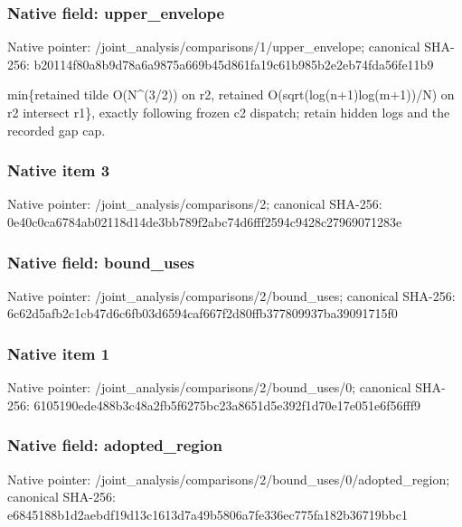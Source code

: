 \documentclass[10pt,a4paper]{article}
\begin{document}
\subsubsection{Native field: upper\_envelope}


Native pointer: /joint\_analysis/comparis\allowbreak{}ons/1/upper\_envelope; canonical SHA-256: b20114f80a8b9d78a6a9875a\allowbreak{}669b45d861fa19c61b985b2e\allowbreak{}2eb74fda56fe11b9


min\{retained tilde O(N\textasciicircum{}(3/2)) on r2, retained O(sqrt(log(n+1)log(m+1))/N) on r2 intersect r1\}, exactly following frozen c2 dispatch; retain hidden logs and the recorded gap cap.


\subsubsection{Native item 3}


Native pointer: /joint\_analysis/comparisons/2; canonical SHA-256: 0e40c0ca6784ab02118d14de\allowbreak{}3bb789f2abc74d6fff2594c9\allowbreak{}428c27969071283e



\subsubsection{Native field: bound\_uses}


Native pointer: /joint\_analysis/comparis\allowbreak{}ons/2/bound\_uses; canonical SHA-256: 6c62d5afb2c1cb47d6c6fb03\allowbreak{}d6594caf667f2d80ffb37780\allowbreak{}9937ba39091715f0



\subsubsection{Native item 1}


Native pointer: /joint\_analysis/comparis\allowbreak{}ons/2/bound\_uses/0; canonical SHA-256: 6105190ede488b3c48a2fb5f\allowbreak{}6275bc23a8651d5e392f1d70\allowbreak{}e17e051e6f56fff9



\subsubsection{Native field: adopted\_region}


Native pointer: /joint\_analysis/comparis\allowbreak{}ons/2/bound\_uses/0/adopt\allowbreak{}ed\_region; canonical SHA-256: e6845188b1d2aebdf19d13c1\allowbreak{}613d7a49b5806a7fe336ec77\allowbreak{}5fa182b36719bbc1
\end{document}
